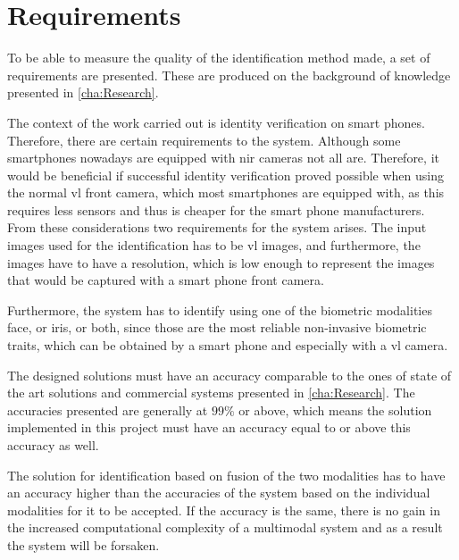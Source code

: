 \chapter{Requirements}\label{ch:req}\glsresetall
To be able to measure the quality of the identification method made, a set of requirements are presented. These are produced on the background of knowledge presented in \autoref{cha:Research}.

The context of the work carried out is identity verification on smart phones. Therefore, there are certain requirements to the system. Although some smartphones nowadays are equipped with \gls{nir} cameras not all are. Therefore, it would be beneficial if successful identity verification proved possible when using the normal \gls{vl} front camera, which most smartphones are equipped with, as this requires less sensors and thus is cheaper for the smart phone manufacturers. From these considerations two requirements for the system arises. The input images used for the identification has to be \gls{vl} images, and furthermore, the images have to have a resolution, which is low enough to represent the images that would be captured with a smart phone front camera.

Furthermore, the system has to identify using one of the biometric modalities face, or iris, or both, since those are the most reliable non-invasive biometric traits, which can be obtained by a smart phone and especially with a \gls{vl} camera. 

The designed solutions must have an accuracy comparable to the ones of state of the art solutions and commercial systems presented in \autoref{cha:Research}. The accuracies presented are generally at $99\%$ or above, which means the solution implemented in this project must have an accuracy equal to or above this accuracy as well. 

The solution for identification based on fusion of the two modalities has to have an accuracy higher than the accuracies of the system based on the individual modalities for it to be accepted. If the accuracy is the same, there is no gain in the increased computational complexity of a multimodal system and as a result the system will be forsaken. 


